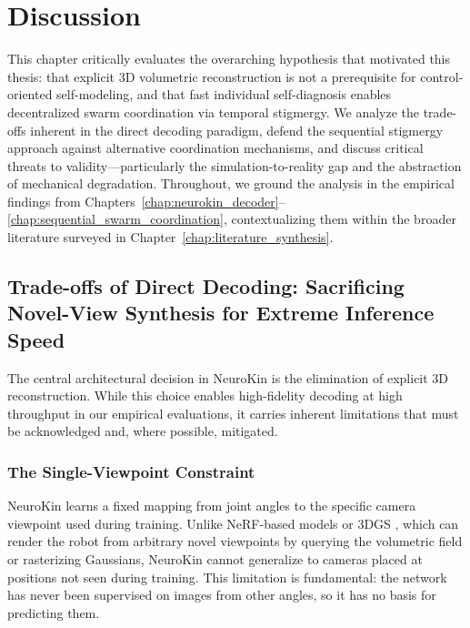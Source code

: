 \documentclass[12pt,a4paper,oneside]{report}
\begin{document}

\chapter{Discussion}
\label{chap:discussion_main}

This chapter critically evaluates the overarching hypothesis that motivated this thesis: that explicit 3D volumetric reconstruction is not a prerequisite for control-oriented self-modeling, and that fast individual self-diagnosis enables decentralized swarm coordination via temporal stigmergy. We analyze the trade-offs inherent in the direct decoding paradigm, defend the sequential stigmergy approach against alternative coordination mechanisms, and discuss critical threats to validity---particularly the simulation-to-reality gap and the abstraction of mechanical degradation. Throughout, we ground the analysis in the empirical findings from Chapters~\ref{chap:neurokin_decoder}--\ref{chap:sequential_swarm_coordination}, contextualizing them within the broader literature surveyed in Chapter~\ref{chap:literature_synthesis}.
\section{Trade-offs of Direct Decoding: Sacrificing Novel-View Synthesis for Extreme Inference Speed}

The central architectural decision in NeuroKin is the elimination of explicit 3D reconstruction. While this choice enables high-fidelity decoding at high throughput in our empirical evaluations, it carries inherent limitations that must be acknowledged and, where possible, mitigated.
\subsection{The Single-Viewpoint Constraint}
\label{subsec:the_single_viewpoint_constraint_main}

NeuroKin learns a fixed mapping from joint angles to the specific camera viewpoint used during training. Unlike NeRF-based models \cite{mildenhall2020nerf} or 3DGS \cite{kerbl20233d}, which can render the robot from arbitrary novel viewpoints by querying the volumetric field or rasterizing Gaussians, NeuroKin cannot generalize to cameras placed at positions not seen during training. This limitation is fundamental: the network has never been supervised on images from other angles, so it has no basis for predicting them.
\end{document}
